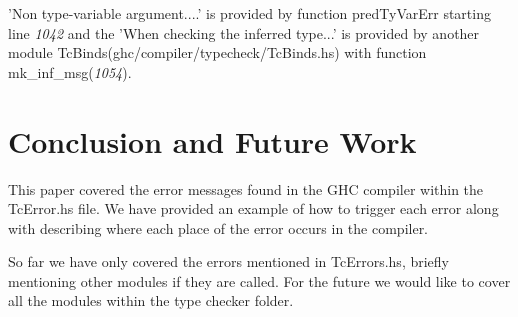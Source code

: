 \documentclass[a4paper]{article}
\begin{document}
'Non type-variable argument....' is provided by function predTyVarErr starting line \textit{1042} and the 'When checking the inferred type...' is provided by another module TcBinds(ghc/compiler/typecheck/TcBinds.hs) with function mk\_inf\_msg(\textit{1054}).



\section{Conclusion and Future Work}

This paper covered the error messages found in the GHC compiler within the TcError.hs file. We have provided an example of how to trigger each error along with describing where each place of the error occurs in the compiler.

So far we have only covered the errors mentioned in TcErrors.hs, briefly mentioning other modules if they are called. For the future we would like to cover all the modules within the type checker folder.




\end{document}
